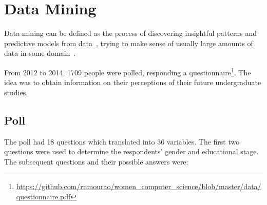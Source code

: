 \section{Data Mining}\label{sec:mining}%

Data mining can be defined as the process of discovering insightful patterns and predictive models from data~\cite{Zaki2014}, trying to make sense of usually large amounts of data in some domain~\cite{Cios2007}. 

From 2012 to 2014, 1709 people were polled, responding a questionnaire\footnote{\url{https://github.com/rnmourao/women\_computer\_science/blob/master/data/questionnaire.pdf}}. The idea was to obtain information on their perceptions of their future undergraduate studies.

\subsection{Poll}\label{sec:mining:poll}%
The poll had 18 questions which translated into 36 variables. The first two questions were used to determine the respondents' gender and educational stage. The subsequent questions and their possible answers were: 

